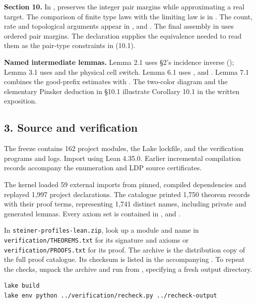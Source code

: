 \documentclass[english,11pt,a4paper]{article}
\begin{document}
\textbf{Section 10.} In ,  preserves the integer pair margins while approximating a real target. The comparison of finite type laws with the limiting law is in . The count, rate and topological arguments appear in ,  and . The final assembly in  uses ordered pair margins. The declaration  supplies the equivalence needed to read them as the pair-type constraints in (10.1).

\textbf{Named intermediate lemmas.} Lemma 2.1 uses §2's incidence inverse (); Lemma 3.1 uses  and the physical cell switch. Lemma 6.1 uses ,  and . Lemma 7.1 combines the good-prefix estimates with . The two-color diagram and the elementary Pinsker deduction in §10.1 illustrate Corollary 10.1 in the written exposition.

\subsection{3. Source and verification}\label{source-and-verification}

The freeze contains 162 project modules, the Lake lockfile, and the verification programs and logs. Import  using Lean 4.35.0. Earlier incremental compilation records accompany the enumeration and LDP source certificates.

The kernel loaded 59 external imports from pinned, compiled dependencies and replayed 1,997 project declarations. The catalogue printed 1,750 theorem records with their proof terms, representing 1,741 distinct names, including private and generated lemmas. Every axiom set is contained in ,  and .

In \texttt{steiner-profiles-lean.zip}, look up a module and name in \texttt{verification/THEOREMS.txt} for its signature and axioms or \texttt{verification/PROOFS.txt} for its proof. The archive is the distribution copy of the full proof catalogue. Its checksum is listed in the accompanying . To repeat the checks, unpack the archive and run from , specifying a fresh output directory.

\begin{verbatim}
lake build
lake env python ../verification/recheck.py ../recheck-output
\end{verbatim}
\end{document}
